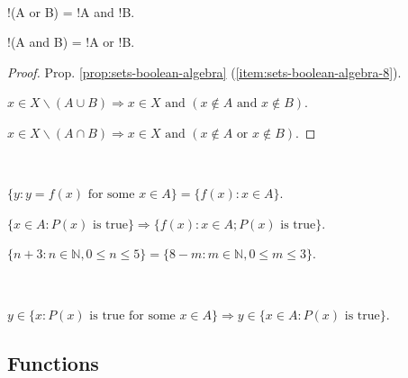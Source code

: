 \documentclass{article}
\begin{document}
\begin{lemma}~

    !(A or B) = !A and !B.

    !(A and B) = !A or !B.
\end{lemma}

\begin{proof}
    Prop. \ref{prop:sets-boolean-algebra} (\ref{item:sets-boolean-algebra-8}).

    $x \in X \backslash (A \cup B) \Rightarrow x \in X \text{ and } (x \notin A \text{ and } x \notin B)$.

    $x \in X \backslash (A \cap B) \Rightarrow x \in X \text{ and } (x \notin A \text{ or } x \notin B)$.
\end{proof}

\begin{example}~

    $\{y : y=f(x) \text{ for some } x \in A\} = \{f(x) : x \in A\}$.

    $\{x \in A : P(x) \text{ is true}\} \Rightarrow \{f(x) : x \in A; P(x) \text{ is true}\}$.
\end{example}

\begin{example}
    $\{n+3 : n \in \mathbb{N}, 0 \leq n \leq 5\} = \{8-m : m \in \mathbb{N}, 0 \leq m \leq 3\}$.
\end{example}

\begin{exercise}~

    $y \in \{x:P(x) \text{ is true for some } x \in A\} \Rightarrow y \in \{x \in A : P(x) \text{ is true}\}$.
\end{exercise}

\subsection{Functions}

\printbibliography
\end{document}
